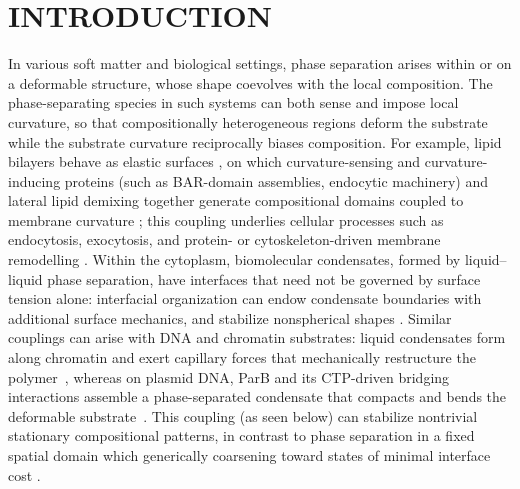 \documentclass[
aip,
jcp,
reprint, 
floatfix
]{revtex4-1}
\begin{document}
\section{INTRODUCTION}
In various soft matter and biological settings, phase separation arises within or on a deformable structure, whose shape coevolves with the local composition. The phase-separating species in such systems can both sense and impose local curvature, so that compositionally heterogeneous regions deform the substrate while the substrate curvature reciprocally biases composition. 
For example, lipid bilayers behave as elastic surfaces \cite{Canham1970,helfrich1973elastic,Seifert1997,dimova2006practical}, on which curvature-sensing and curvature-inducing proteins (such as BAR-domain assemblies, endocytic machinery) and lateral lipid demixing together generate compositional domains coupled to membrane curvature \cite{mcmahon2005membrane,Prevost2015,simunovic2016curvature, VeatchKeller2003,SimonsToomre2000,sorre2009curvature,roux2005role, GoychukFrey2019,tozzi2019out,le2021dynamic, bohinc2005self}; this coupling underlies cellular processes such as endocytosis, exocytosis, and protein- or cytoskeleton-driven membrane remodelling \cite{mcmahon2015membrane,salbreux2012actin,kaksonen2018mechanisms,jahn1999membrane,wu2014exocytosis}. 
Within the cytoplasm, biomolecular condensates, formed by liquid--liquid phase separation, have interfaces that need not be governed by surface tension alone: interfacial organization can endow condensate boundaries with additional surface mechanics, and stabilize nonspherical shapes \cite{Brangwynne2009,Hyman2014,Banani2017,folkmann2021regulation,law2023bending}. 
Similar couplings can arise with DNA and chromatin substrates: liquid condensates form along chromatin and exert capillary forces that mechanically restructure the polymer~\cite{shin2018liquid,larson2017liquid, keenen2021hp1}, whereas on plasmid DNA, ParB and its CTP-driven bridging interactions assemble a phase-separated condensate that compacts and bends the deformable substrate~\cite{brackley2013nonspecific,tivsma2023dynamic,zhao2024phase}.
This coupling (as seen below) can stabilize nontrivial stationary compositional patterns, in contrast to phase separation in a fixed spatial domain which generically coarsening toward states of minimal interface cost \cite{10.1063/1.1744102}.
\end{document}
